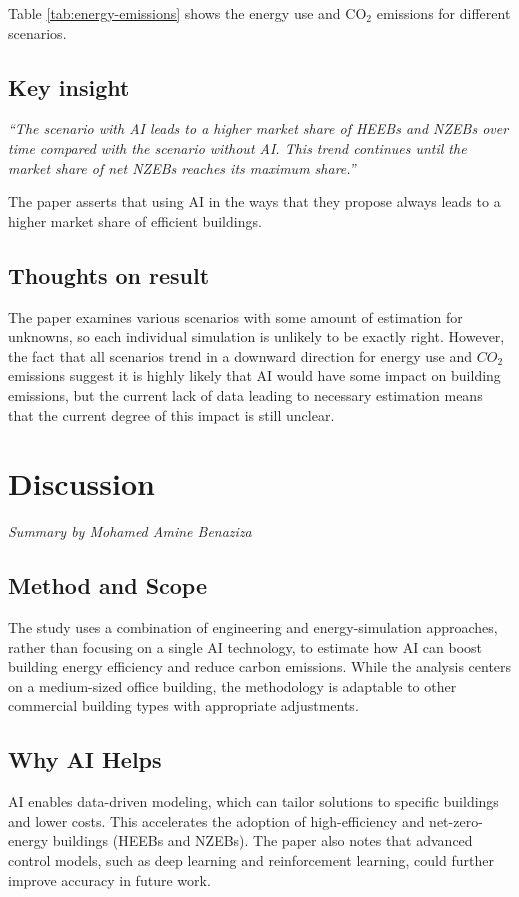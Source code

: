 \documentclass[conference,a4paper]{IEEEtran}
\begin{document}
Table \ref{tab:energy-emissions} shows the energy use and CO$_2$ emissions for different scenarios.


\subsection*{Key insight}

\textit{“The scenario with AI leads to a higher market share of HEEBs and NZEBs over time compared with the scenario without AI. This trend continues until the market share of net NZEBs reaches its maximum share.”}

The paper asserts that using AI in the ways that they propose always leads to a higher market share of efficient buildings. 


\subsection*{Thoughts on result}
The paper examines various scenarios with some amount of estimation for unknowns, so each individual simulation is unlikely to be exactly right. However, the fact that all scenarios trend in a downward direction for energy use and $CO_2$ emissions suggest it is highly likely that AI would have some impact on building emissions, but the current lack of data leading to necessary estimation means that the current degree of this impact is still unclear.


\section*{Discussion}
\textit{Summary by Mohamed Amine Benaziza}

\subsection*{Method and Scope}
The study uses a combination of engineering and energy-simulation approaches, rather than focusing on a single AI technology, to estimate how AI can boost building energy efficiency and reduce carbon emissions. While the analysis centers on a medium-sized office building, the methodology is adaptable to other commercial building types with appropriate adjustments.

\subsection*{Why AI Helps}
AI enables data-driven modeling, which can tailor solutions to specific buildings and lower costs. This accelerates the adoption of high-efficiency and net-zero-energy buildings (HEEBs and NZEBs). The paper also notes that advanced control models, such as deep learning and reinforcement learning, could further improve accuracy in future work.
\end{document}
